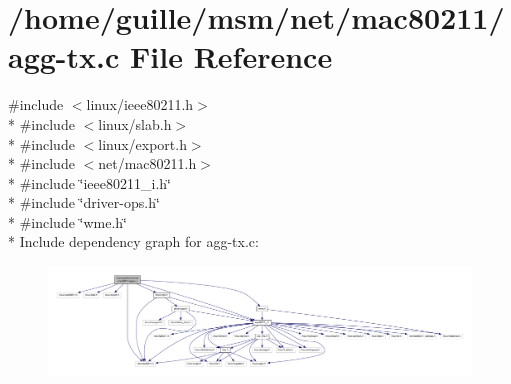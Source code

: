 \hypertarget{agg-tx_8c}{\section{/home/guille/msm/net/mac80211/agg-\/tx.c File Reference}
\label{agg-tx_8c}
}
{\ttfamily \#include $<$linux/ieee80211.\-h$>$}\\*
{\ttfamily \#include $<$linux/slab.\-h$>$}\\*
{\ttfamily \#include $<$linux/export.\-h$>$}\\*
{\ttfamily \#include $<$net/mac80211.\-h$>$}\\*
{\ttfamily \#include \char`\"{}ieee80211\-\_\-i.\-h\char`\"{}}\\*
{\ttfamily \#include \char`\"{}driver-\/ops.\-h\char`\"{}}\\*
{\ttfamily \#include \char`\"{}wme.\-h\char`\"{}}\\*
Include dependency graph for agg-\/tx.c\-:
\nopagebreak
\begin{figure}[H]
\begin{center}
\leavevmode
\includegraphics[width=350pt]{agg-tx_8c__incl}
\end{center}
\end{figure}
